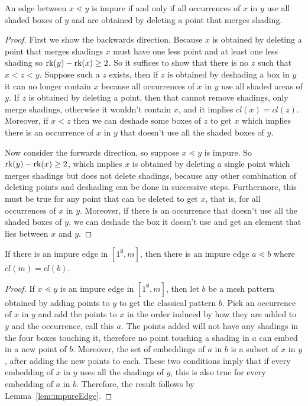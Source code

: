 \documentclass[11pt,a4paper,oneside]{article}
\begin{document}
\begin{lem}\label{lem:impureEdge}
An edge between $x\lessdot y$ is impure if and only if all occurrences of $x$ in $y$ use all shaded boxes of $y$ and are obtained by deleting a point that merges shading.
\begin{proof}
First we show the backwards direction. Because $x$ is obtained by deleting a point that merges shadings $x$ must have one less point and at least one less shading so $\operatorname{\textrm{rk}}(y)-\operatorname{\textrm{rk}}(x)\ge2$. So it suffices to show that there is no $z$ such that $x<z<y$. Suppose such a $z$ exists, then if $z$ is obtained by deshading a box in $y$ it can no longer contain $x$ because all occurrences of $x$ in $y$ use all shaded areas of $y$. If $z$ is obtained by deleting a point, then that cannot remove shadings, only merge shadings, otherwise it wouldn't contain $x$, and it implies $cl(x)=cl(z)$. Moreover, if $x<z$ then we can deshade some boxes of $z$ to get $x$ which implies there is an occurrence of $x$ in $y$ that doesn't use all the shaded boxes of $y$.

Now consider the forwards direction, so suppose $x\lessdot y$ is impure. So $\operatorname{\textrm{rk}}(y)-\operatorname{\textrm{rk}}(x)\ge2$, which implies $x$ is obtained by deleting a single point which merges shadings but does not delete shadings, because any other combination of deleting points and deshading can be done in successive steps. Furthermore, this must be true for any point that can be deleted to get $x$, that is, for all occurrences of $x$ in $y$. Moreover, if there is an occurrence that doesn't use all the shaded boxes of $y$, we can deshade the box it doesn't use and get an element that lies between $x$ and $y$.
\end{proof} 
\end{lem}

\begin{lem}\label{lem:topImpure}
If there is an impure edge in $[1^\emptyset,m]$, then there is an impure edge $a\lessdot b$ where $cl(m)=cl(b)$.
\begin{proof}
If $x\lessdot y$ is an impure edge in $[1^\emptyset,m]$, then let $b$ be a mesh pattern obtained by adding points to $y$ to get the classical pattern $b$. Pick an occurrence of $x$ in $y$ and add the points to $x$ in the order induced by how they are added to $y$ and the occurrence, call this $a$. The points added will not have any shadings in the four boxes touching it, therefore no point touching a shading in $a$ can embed in a new point of $b$. Moreover, the set of embeddings of $a$ in $b$ is a subset of $x$ in $y$, after adding the new points to each. These two conditions imply that if every embedding of $x$ in $y$ uses all the shadings of $y$, this is also true for every embedding of $a$ in $b$. Therefore, the result follows by Lemma~\ref{lem:impureEdge}.
\end{proof}
\end{lem}
\end{document}
